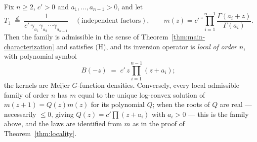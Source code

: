 \begin{proposition}\label{prop:local-ladder}
Fix $n \ge 2$, $c' > 0$ and $a_1, \dots, a_{n-1} > 0$, and let
\[
  T_1 \;\stackrel{d}{=}\; \frac{1}{c'\,\gamma_{a_1}\gamma_{a_2}\cdots\gamma_{a_{n-1}}}
  \quad (\text{independent factors}), \qquad
  m(z) = c'^{\,z}\prod_{i=1}^{n-1}\frac{\Gamma(a_i + z)}{\Gamma(a_i)} .
\]
Then the family is admissible in the sense of Theorem~\ref{thm:main-characterization} and
satisfies (H), and its inversion operator is \emph{local of order $n$}, with polynomial
symbol
\[
  B(-z) \;=\; c'\,z\prod_{i=1}^{n-1}(z + a_i);
\]
the kernels are Meijer $G$-function densities. Conversely, every local admissible family of
order $n$ has $m$ equal to the unique log-convex solution of $m(z+1) = Q(z)m(z)$ for its
polynomial $Q$; when the roots of $Q$ are real --- necessarily $\le 0$, giving
$Q(z) = c'\prod(z+a_i)$ with $a_i > 0$ --- this is the family above, and the laws are
identified from $m$ as in the proof of Theorem~\ref{thm:locality}.
\end{proposition}

